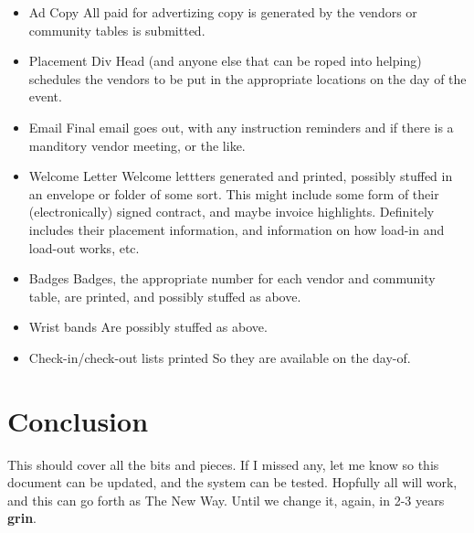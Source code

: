 \documentclass[captions=tablesignature]{scrartcl}
\begin{document}
\begin{itemize}
\item Ad Copy
\label{sec-3-2-11}
All paid for advertizing copy is generated by the vendors or
community tables is submitted.

\item Placement
\label{sec-3-2-12}
Div Head (and anyone else that can be roped into helping)
schedules the vendors to be put in the appropriate locations on
the day of the event.

\item Email
\label{sec-3-2-13}
Final email goes out, with any instruction reminders and if there
is a manditory vendor meeting, or the like.

\item Welcome Letter
\label{sec-3-2-14}
Welcome lettters generated and printed, possibly stuffed in an
envelope or folder of some sort.
This might include some form of their (electronically) signed
contract, and maybe invoice highlights.  Definitely includes their
placement information, and information on how load-in and load-out
works, etc.

\item Badges
\label{sec-3-2-15}
Badges, the appropriate number for each vendor and community
table, are printed, and possibly stuffed as above.

\item Wrist bands
\label{sec-3-2-16}
Are possibly stuffed as above.

\item Check-in/check-out lists printed
\label{sec-3-2-17}
So they are available on the day-of.
\end{itemize}

\section{Conclusion}
\label{sec-4}
This should cover all the bits and pieces.  If I missed any, let me
know so this document can be updated, and the system can be tested.
Hopfully all will work, and this can go forth as The New Way.  Until
we change it, again, in 2-3 years \textbf{grin}.
\end{document}
